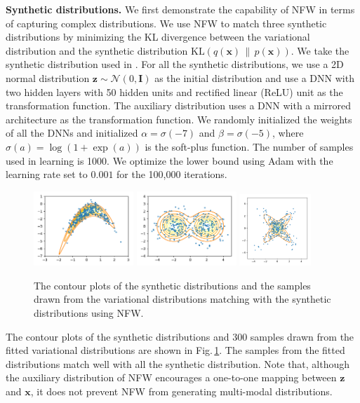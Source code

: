 \documentclass{article}
\newcommand{\xV}{\mathbf{x}}
\newcommand{\zV}{\mathbf{z}}
\newcommand{\I}{\mathbf{I}}
\newcommand{\KL}[2]{\text{KL}\left( #1\,\|\,#2 \right)}
\newcommand{\acr}[1]{\textsc{#1}\xspace}
\newcommand{\us}{\acr{NFW}}
\begin{document}
\textbf{Synthetic distributions.} We first demonstrate the capability of \us in terms of capturing complex distributions. We use \us to match three synthetic distributions by minimizing the KL divergence between the variational distribution and the synthetic distribution $\KL{q(\xV)}{p(\xV)}$. We take the synthetic distribution used in \citep{YinZhou2018,TitsiasRuiz2019}. For all the synthetic distributions, we use a 2D normal distribution $\zV \sim \mathcal{N}(0,\I)$ as the initial distribution and use a DNN with two hidden layers with 50 hidden units and rectified linear (ReLU) unit as the transformation function. The auxiliary distribution uses a DNN with a mirrored architecture as the transformation function. We randomly initialized the weights of all the DNNs and initialized $\alpha=\sigma(-7)$ and $\beta=\sigma(-5)$, where $\sigma(a) = \log(1+\exp(a))$ is the soft-plus function. The number of samples used in learning is 1000. We optimize the lower bound using Adam \citep{KingmaBa2015} with the learning rate set to $0.001$ for the 100,000 iterations. 
%
\begin{figure}
\centering
\includegraphics[width=0.335\textwidth]{syn_func_1.pdf} 
\includegraphics[width=0.335\textwidth]{syn_func_2.pdf} 
\includegraphics[width=0.24\textwidth]{syn_func_3.pdf} 
\caption{The contour plots of the synthetic distributions and the samples drawn from the variational distributions matching with the synthetic distributions using \us. }\label{fig:syn_dist}
\end{figure}
%
The contour plots of the synthetic distributions and 300 samples drawn from the fitted variational distributions are shown in Fig.\,\ref{fig:syn_dist}. The samples from the fitted distributions match well with all the synthetic distribution. Note that, although the auxiliary distribution of \us encourages a one-to-one mapping between $\zV$ and $\xV$, it does not prevent \us from generating multi-modal distributions.
\end{document}
